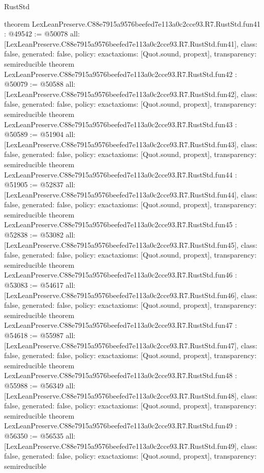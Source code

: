 \begin{lexlean}{RustStd}
\begin{coremodule}
{}
theorem LexLeanPreserve.C88e7915a9576beefed7e113a0c2cce93.R7.RustStd.fun41 : @49542 := @50078 {
  all: [LexLeanPreserve.C88e7915a9576beefed7e113a0c2cce93.R7.RustStd.fun41],
  class: false,
  generated: false,
  policy: exact{axioms: [Quot.sound, propext]},
  transparency: semireducible
}
theorem LexLeanPreserve.C88e7915a9576beefed7e113a0c2cce93.R7.RustStd.fun42 : @50079 := @50588 {
  all: [LexLeanPreserve.C88e7915a9576beefed7e113a0c2cce93.R7.RustStd.fun42],
  class: false,
  generated: false,
  policy: exact{axioms: [Quot.sound, propext]},
  transparency: semireducible
}
theorem LexLeanPreserve.C88e7915a9576beefed7e113a0c2cce93.R7.RustStd.fun43 : @50589 := @51904 {
  all: [LexLeanPreserve.C88e7915a9576beefed7e113a0c2cce93.R7.RustStd.fun43],
  class: false,
  generated: false,
  policy: exact{axioms: [Quot.sound, propext]},
  transparency: semireducible
}
theorem LexLeanPreserve.C88e7915a9576beefed7e113a0c2cce93.R7.RustStd.fun44 : @51905 := @52837 {
  all: [LexLeanPreserve.C88e7915a9576beefed7e113a0c2cce93.R7.RustStd.fun44],
  class: false,
  generated: false,
  policy: exact{axioms: [Quot.sound, propext]},
  transparency: semireducible
}
theorem LexLeanPreserve.C88e7915a9576beefed7e113a0c2cce93.R7.RustStd.fun45 : @52838 := @53082 {
  all: [LexLeanPreserve.C88e7915a9576beefed7e113a0c2cce93.R7.RustStd.fun45],
  class: false,
  generated: false,
  policy: exact{axioms: [Quot.sound, propext]},
  transparency: semireducible
}
theorem LexLeanPreserve.C88e7915a9576beefed7e113a0c2cce93.R7.RustStd.fun46 : @53083 := @54617 {
  all: [LexLeanPreserve.C88e7915a9576beefed7e113a0c2cce93.R7.RustStd.fun46],
  class: false,
  generated: false,
  policy: exact{axioms: [Quot.sound, propext]},
  transparency: semireducible
}
theorem LexLeanPreserve.C88e7915a9576beefed7e113a0c2cce93.R7.RustStd.fun47 : @54618 := @55987 {
  all: [LexLeanPreserve.C88e7915a9576beefed7e113a0c2cce93.R7.RustStd.fun47],
  class: false,
  generated: false,
  policy: exact{axioms: [Quot.sound, propext]},
  transparency: semireducible
}
theorem LexLeanPreserve.C88e7915a9576beefed7e113a0c2cce93.R7.RustStd.fun48 : @55988 := @56349 {
  all: [LexLeanPreserve.C88e7915a9576beefed7e113a0c2cce93.R7.RustStd.fun48],
  class: false,
  generated: false,
  policy: exact{axioms: [Quot.sound, propext]},
  transparency: semireducible
}
theorem LexLeanPreserve.C88e7915a9576beefed7e113a0c2cce93.R7.RustStd.fun49 : @56350 := @56535 {
  all: [LexLeanPreserve.C88e7915a9576beefed7e113a0c2cce93.R7.RustStd.fun49],
  class: false,
  generated: false,
  policy: exact{axioms: [Quot.sound, propext]},
  transparency: semireducible
}
\end{coremodule}
\end{lexlean}
